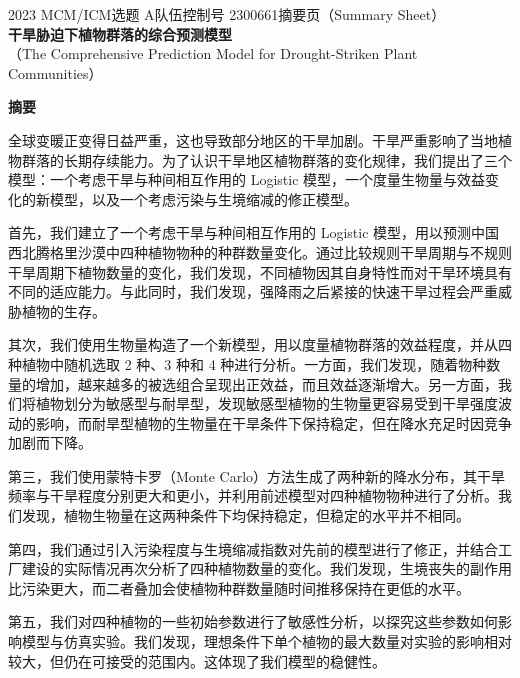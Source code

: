 \documentclass[11pt,a4paper]{ctexart}
\begin{document}
\thispagestyle{empty}
\begin{center}
{\small 2023 MCM/ICM\quad 选题 A\quad 队伍控制号 2300661\quad 摘要页（Summary Sheet）}\\[18pt]
{\LARGE\bfseries 干旱胁迫下植物群落的综合预测模型}\\[8pt]
{\large （The Comprehensive Prediction Model for Drought-Striken Plant Communities）}\\[10pt]
\end{center}

\begin{center}
{\large\bfseries 摘\quad 要}
\end{center}

\vspace{6pt}
全球变暖正变得日益严重，这也导致部分地区的干旱加剧。干旱严重影响了当地植物群落的长期存续能力。为了认识干旱地区植物群落的变化规律，我们提出了三个模型：一个考虑干旱与种间相互作用的 Logistic 模型，一个度量生物量与效益变化的新模型，以及一个考虑污染与生境缩减的修正模型。

首先，我们建立了一个考虑干旱与种间相互作用的 Logistic 模型，用以预测中国西北腾格里沙漠中四种植物物种的种群数量变化。通过比较规则干旱周期与不规则干旱周期下植物数量的变化，我们发现，不同植物因其自身特性而对干旱环境具有不同的适应能力。与此同时，我们发现，强降雨之后紧接的快速干旱过程会严重威胁植物的生存。

其次，我们使用生物量构造了一个新模型，用以度量植物群落的效益程度，并从四种植物中随机选取 2 种、3 种和 4 种进行分析。一方面，我们发现，随着物种数量的增加，越来越多的被选组合呈现出正效益，而且效益逐渐增大。另一方面，我们将植物划分为敏感型与耐旱型，发现敏感型植物的生物量更容易受到干旱强度波动的影响，而耐旱型植物的生物量在干旱条件下保持稳定，但在降水充足时因竞争加剧而下降。

第三，我们使用蒙特卡罗（Monte Carlo）方法生成了两种新的降水分布，其干旱频率与干旱程度分别更大和更小，并利用前述模型对四种植物物种进行了分析。我们发现，植物生物量在这两种条件下均保持稳定，但稳定的水平并不相同。

第四，我们通过引入污染程度与生境缩减指数对先前的模型进行了修正，并结合工厂建设的实际情况再次分析了四种植物数量的变化。我们发现，生境丧失的副作用比污染更大，而二者叠加会使植物种群数量随时间推移保持在更低的水平。

第五，我们对四种植物的一些初始参数进行了敏感性分析，以探究这些参数如何影响模型与仿真实验。我们发现，理想条件下单个植物的最大数量对实验的影响相对较大，但仍在可接受的范围内。这体现了我们模型的稳健性。
\end{document}
